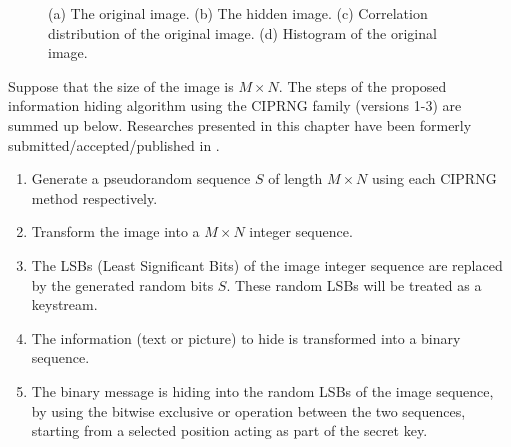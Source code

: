 \begin{figure}
{}

\caption{(a) The original image. (b) The hidden image. (c) Correlation distribution of the original image. (d) Histogram of the original image.}
\label{Original}
\end{figure}

Suppose that the size of the image is $M \times N$. The steps of the proposed information hiding
algorithm using the CIPRNG family (versions 1-3) are summed up below. Researches presented in this chapter have been formerly submitted/accepted/published in \cite{bfg12b:ip}.
\begin{enumerate}
\item Generate a pseudorandom sequence $S$ of length $M \times N$  using each CIPRNG method respectively.
\item Transform the image into a $M \times N$ integer sequence.
\item The LSBs (Least Significant Bits) of the image integer sequence are replaced by the generated random bits $S$. These random LSBs will be treated as a keystream.
\item The information (text or picture) to hide is transformed into a binary sequence.
\item The binary message is hiding into the random LSBs of the image sequence, by using the bitwise exclusive or operation between the two sequences, starting from a selected position acting as part of the secret key.
\end{enumerate}

